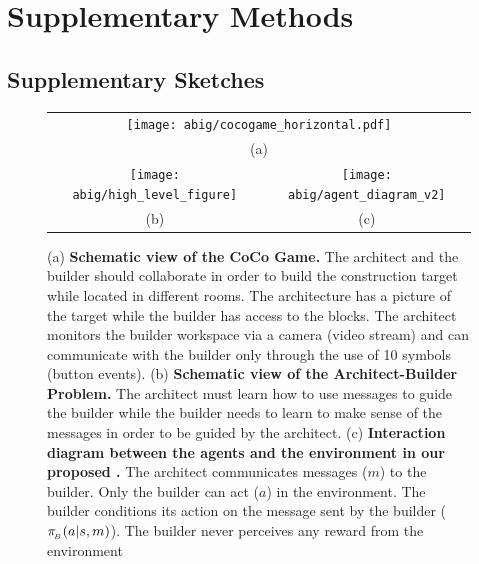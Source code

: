\section{Supplementary Methods}
\label{ap:method}

\subsection{Supplementary Sketches}
\label{ap:sec_sketch}
\begin{figure}[h!]
    \centering
    \begin{tabular}{cc}
    \multicolumn{2}{c}{\texttt{[image: abig/cocogame\_horizontal.pdf]}}\\
    \multicolumn{2}{c}{\small (a)}\\
 \texttt{[image: abig/high\_level\_figure]}    &  \texttt{[image: abig/agent\_diagram\_v2]} \\
    \small (b) & \small(c)
    \end{tabular}
    \caption{\small (a) \textbf{Schematic view of the CoCo Game.} The architect and the builder should collaborate in order to build the construction target while located in different rooms. The architecture has a picture of the target while the builder has access to the blocks. The architect monitors the builder workspace via a camera (video stream) and can communicate with the builder only through the use of 10 symbols (button events). (b) \textbf{Schematic view of the Architect-Builder Problem. } The architect must learn how to use messages to guide the builder while the builder needs to learn to make sense of the messages in order to be guided by the architect. (c) \textbf{Interaction diagram between the agents and the environment in our proposed \abp.} The architect communicates messages ($m$) to the builder.  Only the builder can act ($a$) in the environment. The builder conditions its action on the message sent by the builder ($\pi_{\!_B}(a|s,m)$). The builder never perceives any reward from the environment}
    \label{fig:sup_diagram}
\end{figure}

